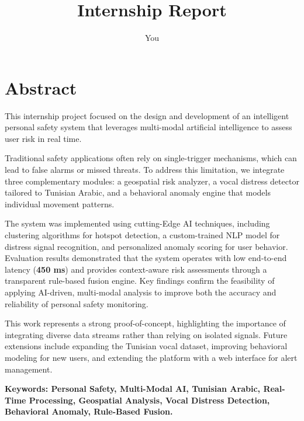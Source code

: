 \documentclass[12pt,a4paper,oneside,english]{book}
\author{You}
\title{Internship Report}
\begin{document}


\frontmatter %
\chapter*{Abstract}
\normalsize{
    
This internship project focused on the design and development of  an intelligent personal safety system that leverages multi-modal artificial intelligence to assess user risk in real time. 

Traditional safety applications often rely on single-trigger mechanisms, which can lead to false alarms or missed threats. To address this limitation, we integrate three complementary modules: a geospatial risk analyzer, a vocal distress detector tailored to Tunisian Arabic, and a behavioral anomaly engine that models individual movement patterns. 

The system was implemented using cutting-Edge AI techniques, including clustering algorithms for hotspot detection, a custom-trained NLP model for distress signal recognition, and personalized anomaly scoring for user behavior. Evaluation results demonstrated that the system operates with low end-to-end latency (\textbf{450 ms}) and provides context-aware risk assessments through a transparent rule-based fusion engine. Key findings confirm the feasibility of applying AI-driven, multi-modal analysis to improve both the accuracy and reliability of personal safety monitoring. 

This work represents a strong proof-of-concept, highlighting the importance of integrating diverse data streams rather than relying on isolated signals. Future extensions include expanding the Tunisian vocal dataset, improving behavioral modeling for new users, and extending the platform with a web interface for alert management. 


}

\medskip
{\noindent \textbf{Keywords: Personal Safety, Multi-Modal AI, Tunisian Arabic, Real-Time Processing, Geospatial Analysis, Vocal Distress Detection, Behavioral Anomaly, Rule-Based Fusion.}}
\tableofcontents{}
\newpage 
\listoffigures
\newpage 
\listoftables
\newpage
{}
\end{document}
